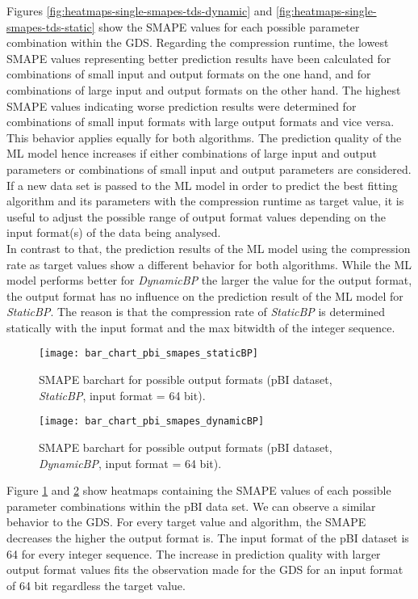 Figures \ref{fig:heatmaps-single-smapes-tds-dynamic} and \ref{fig:heatmaps-single-smapes-tds-static} show the SMAPE values for each possible parameter combination within the GDS. Regarding the compression runtime, the lowest SMAPE values representing better prediction results have been calculated for combinations of small input and output formats on the one hand, and for combinations of large input and output formats on the other hand. The highest SMAPE values indicating worse prediction results were determined for combinations of small input formats with large output formats and vice versa.
This behavior applies equally for both algorithms. The prediction quality of the ML model hence increases if either combinations of large input and output parameters or combinations of small input and output parameters are considered.
If a new data set is passed to the ML model in order to predict the best fitting algorithm and its parameters with the compression runtime as target value, it is useful to adjust the possible range of output format values depending on the input format(s) of the data being analysed.\\ 
In contrast to that, the prediction results of the ML model using the compression rate as target values show a different behavior for both algorithms. While the ML model performs better for \emph{DynamicBP} the larger the value for the output format, the output format has no influence on the prediction result of the ML model for \emph{StaticBP}. The reason is that the compression rate of \emph{StaticBP} is determined statically with the input format and the max bitwidth of the integer sequence.

\begin{figure}[h]
    \centering
    \texttt{[image: bar\_chart\_pbi\_smapes\_staticBP]}
    \caption{SMAPE barchart for possible output formats (pBI dataset, \emph{StaticBP}, input format = 64 bit).}
    \label{fig:smapes_pbi_static}
\end{figure}
\begin{figure}[h]
    \centering
    \texttt{[image: bar\_chart\_pbi\_smapes\_dynamicBP]}
    \caption{SMAPE barchart for possible output formats (pBI dataset, \emph{DynamicBP}, input format = 64 bit).}
    \label{fig_smapes_pbi_dynamic}
\end{figure}

Figure \ref{fig:smapes_pbi_static} and \ref{fig_smapes_pbi_dynamic} show heatmaps containing the SMAPE values of each possible parameter combinations within the pBI data set. We can observe a similar behavior to the GDS. For every target value and algorithm, the SMAPE decreases the higher the output format is. The input format of the pBI dataset is 64 for every integer sequence. The increase in prediction quality with larger output format values fits the observation made for the GDS for an input format of 64 bit regardless the target value.   

